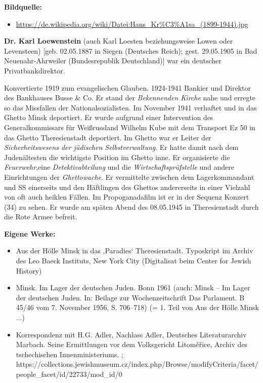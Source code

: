 \documentclass[a4paper]{article}
\begin{document}
\bigskip

\textbf{Bildquelle:}

\begin{itemize}
\item \url{https://de.wikipedia.org/wiki/Datei:Hans_Kr%C3%A1sa_(1899-1944).jpg} 
\end{itemize}
\textbf{Dr. Karl Loewenstein} (auch Karl Loesten beziehungsweise Lowen oder Levensteen) [geb. 02.05.1887 in Siegen
(Deutsches Reich); gest. 29.05.1905 in Bad Neuenahr-Ahrweiler (Bundesrepublik Deutschland)] war ein deutscher
Privatbankdirektor. 

Konvertierte 1919 zum evangelischen Glauben. 1924-1941 Bankier und Direktor des Bankhauses Busse \& Co. Er stand der
\textit{Bekennenden Kirche} nahe und erregte so das Missfallen der Nationalsozialisten. Im November 1941 verhaftet und
in das Ghetto Minsk deportiert. Er wurde aufgrund einer Intervention des Generalkommissars für Weißrussland Wilhelm
Kube mit dem Transport Ez 50 in das Ghetto Theresienstadt deportiert. Im Ghetto war er Leiter der
\textit{Sicherheitswesens der jüdischen Selbstverwaltung}. Er hatte damit nach dem Judenältesten die wichtigste
Position im Ghetto inne. Er organisierte die \textit{Feuerwehr},eine \textit{Detektivabteilung} und die
\textit{Wirtschaftsprüfstelle} und andere Einrichtungen der \textit{Ghettowache}. Er vermittelte zwischen dem
Lagerkommandant und SS einerseits und den Häftlingen des Ghettos andererseits in einer Vielzahl von oft auch heiklen
Fällen. Im Propoganadafilm ist er in der Sequenz Konzert (34) zu sehen. Er wurde am späten Abend des 08.05.1945 in
Theresienstadt durch die Rote Armee befreit. 


\bigskip

\textbf{Eigene Werke:}

\begin{itemize}
\item Aus der Hölle Minsk in das ‚Paradies‘ Theresienstadt. Typoskript im Archiv des Leo Baeck Instituts, New York City
(Digitalisat beim Center for Jewish History)  
\item Minsk. Im Lager der deutschen Juden. Bonn 1961 (auch: Minsk – Im Lager der deutschen Juden. In: Beilage zur
Wochenzeitschrift Das Parlament. B 45/46 vom 7. November 1956, S. 706–718) (= 1. Teil von Aus der Hölle Minsk ...)  
\item Korrespondenz mit H.G. Adler, Nachlass Adler, Deutsches Literaturarchiv Marbach.  Seine Ermittlungen vor dem
Volksgericht Litoměřice, Archiv des tschechischen Innenministeriums. ;
https://collections.jewishmuseum.cz/index.php/Browse/modifyCriteria/facet/people\_facet/id/22733/mod\_id/0 
\end{itemize}
\end{document}
